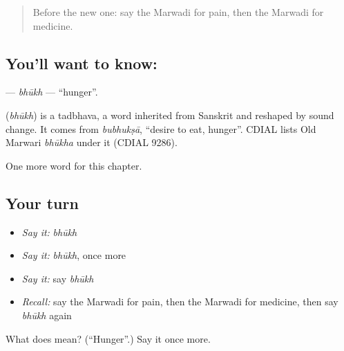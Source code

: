 \label{lesson:MW-C47-bhukh}



\begin{quote}
Before the new one: say the Marwadi for pain, then the Marwadi for medicine.
\end{quote}

\subsection*{You'll want to know: }
\textbf{} — \emph{bhūkh} — \textquotedblleft{}hunger\textquotedblright{}.

\begin{cousinweb}
\textbf{} (\emph{bhūkh}) is a tadbhava, a word inherited from Sanskrit and reshaped by sound change. It comes from \emph{bubhukṣā}, \textquotedblleft{}desire to eat, hunger\textquotedblright{}. CDIAL lists Old Marwari \emph{bhūkha} under it (CDIAL 9286).
\end{cousinweb}

\begin{grammarlens}[title={What you've built}]
One more word for this chapter.
\end{grammarlens}

\subsection*{Your turn}
\begin{itemize}
\raggedright
  \item \emph{Say it:} \emph{bhūkh}
  \item \emph{Say it:} \emph{bhūkh}, once more
  \item \emph{Say it:} say \emph{bhūkh}
  \item \emph{Recall:} say the Marwadi for pain, then the Marwadi for medicine, then say \emph{bhūkh} again
\end{itemize}

\begin{tcolorbox}[breakable,colback=teal!4,colframe=teal!35!black,title={Before you move on}]
What does  mean? (\textquotedblleft{}Hunger\textquotedblright{}.) Say it once more.
\end{tcolorbox}
